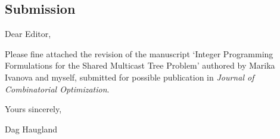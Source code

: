 \documentclass[12pt]{article}
\begin{document}
\begin{center}
\section*{Submission}
\end{center}

\vspace{2em}
\noindent
Dear Editor,

\vspace{4em}
\noindent
Please fine attached the revision of the manuscript `Integer Programming Formulations for the Shared Multicast Tree Problem'
authored by Marika Ivanova and myself, submitted for possible publication in \emph{Journal of Combinatorial Optimization}.

\vspace{1em}
\vspace{1em}
\vspace{1em}
\vspace{1em}
\vspace{1em}

\noindent
Yours sincerely,

\vspace{1em}
\vspace{1em}
\noindent
Dag Haugland
\end{document}
